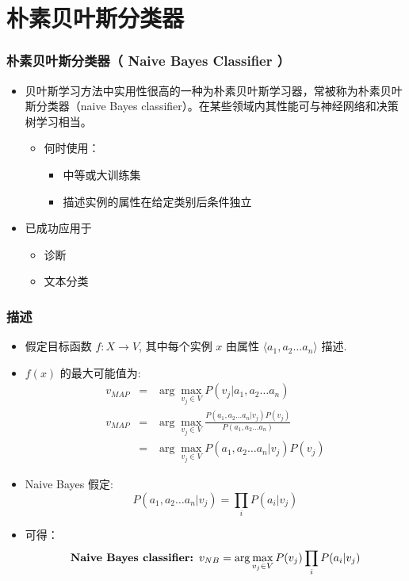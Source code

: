 \documentclass{beamer}
\begin{document}
\section{朴素贝叶斯分类器}
\label{sec-7}
\begin{frame}
\frametitle{朴素贝叶斯分类器（ Naive Bayes Classifier ）}
\label{sec-7-1}

\begin{itemize}
\item 贝叶斯学习方法中实用性很高的一种为朴素贝叶斯学习器，常被称为朴素贝叶斯分类器（naive Bayes classifier）。在某些领域内其性能可与神经网络和决策树学习相当。
\begin{itemize}
\item 何时使用：
\begin{itemize}
\item 中等或大训练集
\item 描述实例的属性在给定类别后条件独立
\end{itemize}
\end{itemize}
\item 已成功应用于
\begin{itemize}
\item 诊断
\item 文本分类
\end{itemize}
\end{itemize}
\end{frame}
\begin{frame}
\frametitle{描述}
\label{sec-7-2}


\begin{itemize}
\item 假定目标函数 $f: X \rightarrow V$, 其中每个实例 $x$ 由属性 $\langle a_{1}, a_{2} \ldots a_{n} \rangle$ 描述.
\item $f(x)$ 的最大可能值为:
     \begin{eqnarray}
     v_{MAP} &= &\arg \max_{v_{j} \in V} P(v_{j} | a_{1}, a_{2} \ldots a_{n})  \nonumber \\ 
     v_{MAP} &= &\arg \max_{v_{j} \in V} \frac{P(a_{1}, a_{2} \ldots a_{n}|v_{j})
     P(v_{j})}{P(a_{1}, a_{2} \ldots a_{n})} \nonumber \\ 
     &= &\arg \max_{v_{j} \in V} P(a_{1}, a_{2} \ldots a_{n}|v_{j}) P(v_{j}) \nonumber
     \end{eqnarray}
\item Naive Bayes 假定:
   \[ P(a_{1}, a_{2} \ldots a_{n}|v_{j}) = \prod_{i} P(a_{i} | v_{j}) \]
\item 可得： 
   \[\mbox{\bf Naive Bayes classifier: } v_{NB} = \arg \max_{v_{j} \in V} P(v_{j})\prod_{i} P(a_{i} | v_{j}) \]
\end{itemize}
\end{frame}
\end{document}
